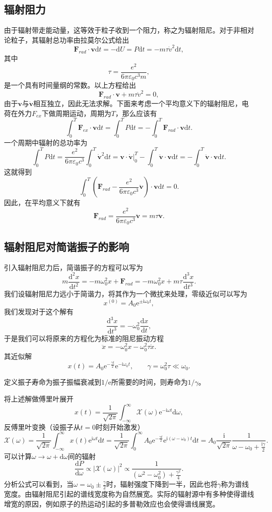 \documentclass[UTF8]{ctexbook}
\newcommand{\e}{\mathrm{e}}
\renewcommand{\d}{\mathrm{d}}
\renewcommand{\b}{\boldsymbol}
\renewcommand{\i}{\mathrm{i}}
\numberwithin{equation}{chapter}
\begin{document}
	\subsection{辐射阻力}
	
	由于辐射带走能动量，这等效于粒子收到一个阻力，称之为辐射阻尼。对于非相对论粒子，其辐射总功率由拉莫尔公式给出
	\[\b{F}_{rad}\cdot\b{v}\d t=-\d U=P\d t=-m\tau\dot{v}^2\d t,\]
	其中
	\[\tau=\frac{e^2}{6\pi\varepsilon_0 c^3 m},\]
	是一个具有时间量纲的常数。以上方程给出
	\[\b{F}_{rad}\cdot\b{v}+m\tau\dot{v}^2=0,\]
	由于$\b{v}$与$\dot{\b{v}}$相互独立，因此无法求解。下面来考虑一个平均意义下的辐射阻尼，电荷在外力$F_{ex}$下做周期运动，周期为$T$，那么应该有
	\[\int_0^T\b{F}_{ex} \cdot\b{v}\d t=\int_0^T P\d t=-\int_0^T \b{F}_{rad}\cdot\b{v}\d t. \]
	一个周期中辐射的总功率为
	\[\int_0^T P\d t=\frac{e^2}{6\pi\varepsilon_0 c^3}\int_0^T \dot{\b{v}}^2\d t=\b{v}\cdot\dot{\b{v}}|_0^T-\int_0^T\ddot{\b{v}}\cdot\b{v}\d t=-\int_0^T \ddot{\b{v}}\cdot\b{v}\d t.\]
	这就得到
	\[\int_0^T\left(\b{F}_{rad}-\frac{e^2}{6\pi\varepsilon_0 c^3}\ddot{\b{v}}\right)\cdot\b{v}\d t=0.\]
	因此，在平均意义下就有
	\[\b{F}_{rad}=\frac{e^2}{6\pi\varepsilon_0 c^3}\ddot{\b{v}}=m\tau\ddot{\b{v}}.\]
		
	\subsection{辐射阻尼对简谐振子的影响}
	
	引入辐射阻尼力后，简谐振子的方程可以写为
	\[m\frac{\d^2 x}{\d t^2}=-m\omega_0^2 x+\b{F}_{rad}=-m\omega_0^2 x+m\tau\frac{\d^3 x}{\d t^3}.\]
	我们设辐射阻尼力远小于简谐力，将其作为一个微扰来处理，零级近似可以写为
	\[x^{(0)}=A_0\e^{\pm\i\omega_0t},\]
	我们发现对于这个解有
	\[\frac{\d^3 x}{\d t^3}=-\omega_0^2 \frac{\d x}{\d t},\]
	于是我们可以将原来的方程化为标准的阻尼振动方程
	\[\ddot{x}=-\omega_0^2 x-\omega_0^2 \tau\dot{x}.\]
	其近似解
	\[x(t)=A_0\e^{-\frac{\gamma t}{2}}\e^{-\i\omega_0 t},\qquad \gamma=\omega_0^2\tau \ll \omega_0.\]
	
	定义振子寿命为振子振幅衰减到$1/\e$所需要的时间，则寿命为$1/\gamma$。
	
	将上述解做傅里叶展开
	\[x(t)=\frac{1}{\sqrt{2\pi}}\int_{-\infty}^\infty \mathcal{X}(\omega)\e^{-\i\omega t}\d \omega,\]
	反傅里叶变换（设振子从$t=0$时刻开始激发）
	\[\mathcal{X}(\omega)=\frac{1}{\sqrt{2\pi}}\int_{-\infty}^\infty x(t)\e^{\i\omega t}\d t=\frac{1}{\sqrt{2\pi}}\int_0^\infty A_0\e^{-\frac{\gamma t}{2}}\e^{\i(\omega-\omega_0)t}\d t=A_0\frac{\i}{\sqrt{2\pi}}\frac{1}{\omega-\omega_0+\frac{\i\gamma}{2}}.\]
	可以计算$\omega\rightarrow \omega+\d\omega$间的辐射
	\[\frac{\d P}{\d \omega}\propto |\mathcal{X}(\omega)|^2\propto \frac{1}{(\omega^2-\omega_0^2)+\frac{\gamma^2}{4}}.\]
	分析公式可以看到，当$\omega=\omega_0\pm\frac{\gamma}{2}$时，辐射强度下降到一半，因此也将$\gamma$称为谱线宽度。由辐射阻尼引起的谱线宽度称为自然展宽。实际的辐射源中有多种使得谱线增宽的原因，例如原子的热运动引起的多普勒效应也会使得谱线展宽。
	
\end{document}
